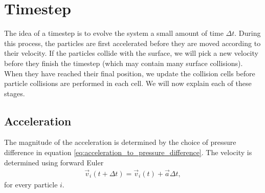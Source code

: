 \section{Timestep}
\label{sec:dsmc_implementation_timestep}
The idea of a timestep is to evolve the system a small amount of time $\Delta t$. During this process, the particles are first accelerated before they are moved according to their velocity. If the particles collide with the surface, we will pick a new velocity before they finish the timestep (which may contain many surface collisions). When they have reached their final position, we update the collision cells before particle collisions are performed in each cell. We will now explain each of these stages.
\subsection{Acceleration}
The magnitude of the acceleration is determined by the choice of pressure difference in equation \eqref{eq:acceleration_to_pressure_difference}. The velocity is determined using forward Euler
\begin{align}
	\vec v_i(t + \Delta t) = \vec v_i(t) + \vec a\Delta t,
\end{align}
for every particle $i$. 
